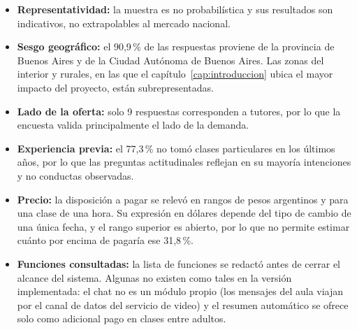 \begin{itemize}
    \item \textbf{Representatividad:} la muestra es no probabilística y
          sus resultados son indicativos, no extrapolables al mercado
          nacional.
    \item \textbf{Sesgo geográfico:} el 90,9\,\% de las respuestas
          proviene de la provincia de Buenos Aires y de la Ciudad
          Autónoma de Buenos Aires. Las zonas del interior y rurales, en
          las que el capítulo~\ref{cap:introduccion} ubica el mayor
          impacto del proyecto, están subrepresentadas.
    \item \textbf{Lado de la oferta:} solo 9 respuestas corresponden a
          tutores, por lo que la encuesta valida principalmente el lado
          de la demanda.
    \item \textbf{Experiencia previa:} el 77,3\,\% no tomó clases
          particulares en los últimos años, por lo que las preguntas
          actitudinales reflejan en su mayoría intenciones y no conductas
          observadas.
    \item \textbf{Precio:} la disposición a pagar se relevó en rangos de
          pesos argentinos y para una clase de una hora. Su expresión en
          dólares depende del tipo de cambio de una única fecha, y el
          rango superior es abierto, por lo que no permite estimar cuánto
          por encima de  pagaría ese 31,8\,\%.
    \item \textbf{Funciones consultadas:} la lista de funciones se
          redactó antes de cerrar el alcance del sistema. Algunas no
          existen como tales en la versión implementada: el chat no es un
          módulo propio (los mensajes del aula viajan por el canal de datos
          del servicio de video) y el resumen automático se ofrece solo
          como adicional pago en clases entre adultos.
\end{itemize}
